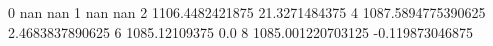 0 nan nan
1 nan nan
2 1106.4482421875 21.3271484375
4 1087.5894775390625 2.4683837890625
6 1085.12109375 0.0
8 1085.001220703125 -0.119873046875
